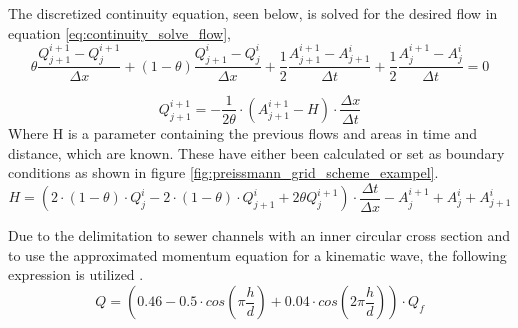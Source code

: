 
The discretized continuity equation, seen below, is solved for the desired flow in equation \ref{eq:continuity_solve_flow},
\begin{equation}
    \theta \frac{Q_{j+1}^{i+1}-Q_j^{i+1}}{\Delta x}+(1-\theta)\frac{Q_{j+1}^i - Q_j^i}{\Delta x}+
    \frac{1}{2}\frac{A_{j+1}^{i+1}-A_{j+1}^i}{\Delta t} + \frac{1}{2} \frac{A_{j}^{i+1} - A_j^i}{\Delta t} = 0
\end{equation}

\begin{equation}\label{eq:continuity_solve_flow}
    Q_{j+1}^{i+1} = - \frac{1}{2\theta}\cdot\left(A_{j+1}^{i+1}-H\right)\cdot\frac{\Delta x}{\Delta t}
\end{equation}
Where H is a parameter containing the previous flows and areas in time and distance, which are known. These have either been calculated or set as boundary conditions as shown in figure \ref{fig:preissmann_grid_scheme_exampel}.
\begin{equation}
    H = \left(2\cdot(1-\theta)\cdot Q_j^i-2\cdot(1-\theta)\cdot Q_{j+1}^i+2\theta Q_j^{i+1}\right)\cdot\frac{\Delta t}{\Delta x}- A_{j}^{i+1}+A_j^i+A_{j+1}^i
\end{equation}

Due to the delimitation to sewer channels with an inner circular cross section and to use the approximated momentum equation for a kinematic wave,
the following expression is utilized \cite{ikke_stationear}. %
\begin{equation}\label{eq:calc_for_flowv2}
     Q = \left(0.46-0.5 \cdot cos\left(\pi \frac{h}{d}\right)+0.04\cdot cos\left(2\pi\frac{h}{d}\right)\right)\cdot Q_f
\end{equation}

